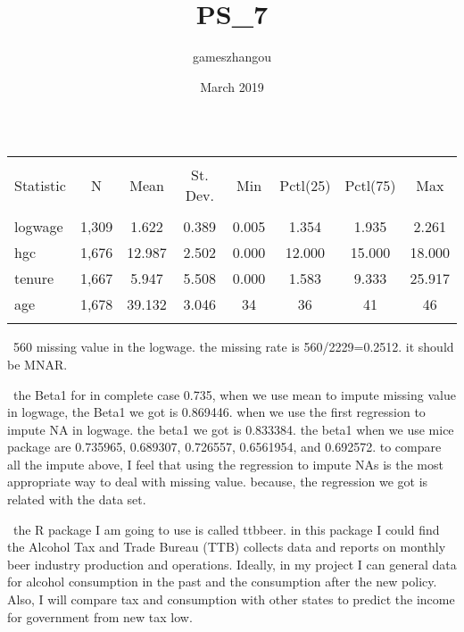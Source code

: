 \documentclass{article}
\title{PS_7}
\author{gameszhangou }
\date{March 2019}
\begin{document}
\begin{table}[!htbp] \centering 
  \caption{} 
  \label{} 
\begin{tabular}{@{\extracolsep{5pt}}lccccccc} 
\\[-1.8ex]\hline 
\hline \\[-1.8ex] 
Statistic & \multicolumn{1}{c}{N} & \multicolumn{1}{c}{Mean} & \multicolumn{1}{c}{St. Dev.} & \multicolumn{1}{c}{Min} & \multicolumn{1}{c}{Pctl(25)} & \multicolumn{1}{c}{Pctl(75)} & \multicolumn{1}{c}{Max} \\ 
\hline \\[-1.8ex] 
logwage & 1,309 & 1.622 & 0.389 & 0.005 & 1.354 & 1.935 & 2.261 \\ 
hgc & 1,676 & 12.987 & 2.502 & 0.000 & 12.000 & 15.000 & 18.000 \\ 
tenure & 1,667 & 5.947 & 5.508 & 0.000 & 1.583 & 9.333 & 25.917 \\ 
age & 1,678 & 39.132 & 3.046 & 34 & 36 & 41 & 46 \\ 
\hline \\[-1.8ex] 
\end{tabular} 
\end{table} 



\
560 missing value in the logwage. the missing rate is 560/2229=0.2512. it should be MNAR.

\
the Beta1 for in complete case 0.735, when we use mean to impute missing value in logwage, the Beta1 we got is 0.869446. when we use the first regression to impute NA in logwage. the beta1 we got is 0.833384. the beta1 when we use mice package are 0.735965, 0.689307, 0.726557, 0.6561954, and 0.692572. to compare all the impute above, I feel that using the regression to impute NAs is the most appropriate way to deal with missing value. because, the regression we got is related with the data set. 

\
the R package I am going to use is called ttbbeer. in this package I could find the Alcohol Tax and Trade Bureau (TTB) collects data and reports on monthly beer industry production and operations. Ideally, in my project I can general data for alcohol consumption in the past and the consumption after the new policy. Also, I will compare tax and consumption with other states to predict the income for government from new tax low.
\end{document}
